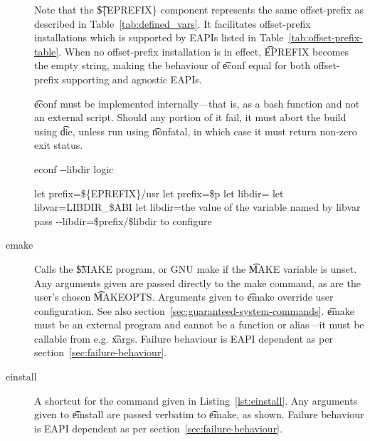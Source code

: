 \begin{description}
    Note that the \t{\$\{EPREFIX\}} component represents the same offset-prefix as described in
    Table~\ref{tab:defined_vars}.  It facilitates offset-prefix installations which is supported by EAPIs
    listed in Table~\ref{tab:offset-prefix-table}. When no offset-prefix installation is in effect,
    \t{EPREFIX} becomes the empty string, making the behaviour of \t{econf} equal for both offset-prefix
    supporting and agnostic EAPIs.

    \t{econf} must be implemented internally---that is, as a bash function and not an external
    script. Should any portion of it fail, it must abort the build using \t{die}, unless run using
    \t{nonfatal}, in which case it must return non-zero exit status.

\begin{algorithm}
\caption{econf -{}-libdir logic} \label{alg:econf-libdir}
\begin{algorithmic}[1]
\STATE let prefix=\$\{EPREFIX\}/usr
    \STATE let prefix=\$p
\ENDIF
\STATE let libdir=
    \STATE let libvar=LIBDIR\_\$ABI
        \STATE let libdir=the value of the variable named by libvar
    \ENDIF
\ENDIF
{}
    \STATE pass -{}-libdir=\$prefix/\$libdir to configure
\ENDIF
\end{algorithmic}
\end{algorithm}

\item[emake] Calls the \t{\$MAKE} program, or GNU make if the \t{MAKE} variable is unset.  Any
    arguments given are passed directly to the make command, as are the user's chosen \t{MAKEOPTS}\@.
    Arguments given to \t{emake} override user configuration. See also
    section~\ref{sec:guaranteed-system-commands}. \t{emake} must be an external program and cannot be a
    function or alias---it must be callable from e.g. \t{xargs}. Failure behaviour is EAPI dependent
    as per section~\ref{sec:failure-behaviour}.
\item[einstall] A shortcut for the command given in Listing~\ref{lst:einstall}. Any arguments given
    to \t{einstall} are passed verbatim to \t{emake}, as shown. Failure behaviour is EAPI dependent
    as per section~\ref{sec:failure-behaviour}.


\end{description}
